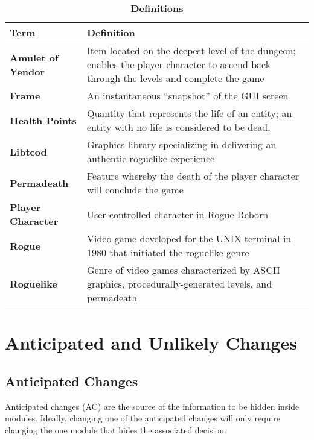 \documentclass[12pt, titlepage]{article}
\newcommand{\newSection}[1]{
  \newpage
  \section{#1}
}
\begin{document}
        \begin{table}[H]
            \centering
            \caption{\bf Definitions}
            \label{TableDefinitions}
            \bigskip
            \def\arraystretch{1.5}
            \begin{tabularx}{\textwidth}{p{3.7cm}X}
                \toprule
                \textbf{Term} & \textbf{Definition}\\
                \midrule
                \textbf{Amulet of Yendor} & Item located on the deepest level of the dungeon; enables the player character to ascend back through the levels and complete the game\\
                \textbf{Frame} & An instantaneous ``snapshot'' of the GUI screen\\
                \textbf{Health Points} & Quantity that represents the life of an entity; an entity with no life is considered to be dead.\\
                \textbf{Libtcod} & Graphics library specializing in delivering an authentic roguelike experience\\
                \textbf{Permadeath} & Feature whereby the death of the player character will conclude the game\\
                \textbf{Player Character} & User-controlled character in Rogue Reborn\\
                \textbf{Rogue} & Video game developed for the UNIX terminal in 1980 that initiated the roguelike genre\\
                \textbf{Roguelike} & Genre of video games characterized by ASCII graphics, procedurally-generated levels, and permadeath\\
                \bottomrule
            \end{tabularx}
        \end{table} 

\newSection{Anticipated and Unlikely Changes} \label{SecChange}

    \subsection{Anticipated Changes} \label{SecAchange}

        Anticipated changes (AC) are the source of the information to be hidden inside modules. Ideally, changing one of the anticipated changes will only require changing the one module that hides the associated decision.
\end{document}
